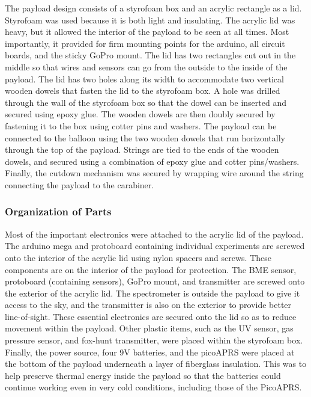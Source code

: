 \documentclass[12pt,]{article}
\begin{document}
The payload design consists of a styrofoam box and an acrylic rectangle
as a lid. Styrofoam was used because it is both light and insulating.
The acrylic lid was heavy, but it allowed the interior of the payload to
be seen at all times. Most importantly, it provided for firm mounting
points for the arduino, all circuit boards, and the sticky GoPro mount.
The lid has two rectangles cut out in the middle so that wires and
sensors can go from the outside to the inside of the payload. The lid
has two holes along its width to accommodate two vertical wooden dowels
that fasten the lid to the styrofoam box. A hole was drilled through the
wall of the styrofoam box so that the dowel can be inserted and secured
using epoxy glue. The wooden dowels are then doubly secured by fastening
it to the box using cotter pins and washers. The payload can be
connected to the balloon using the two wooden dowels that run
horizontally through the top of the payload. Strings are tied to the
ends of the wooden dowels, and secured using a combination of epoxy glue
and cotter pins/washers. Finally, the cutdown mechanism was secured by
wrapping wire around the string connecting the payload to the carabiner.

\subsubsection{Organization of Parts}\label{organization-of-parts}

Most of the important electronics were attached to the acrylic lid of
the payload. The arduino mega and protoboard containing individual
experiments are screwed onto the interior of the acrylic lid using nylon
spacers and screws. These components are on the interior of the payload
for protection. The BME sensor, protoboard (containing sensors), GoPro
mount, and transmitter are screwed onto the exterior of the acrylic lid.
The spectrometer is outside the payload to give it access to the sky,
and the transmitter is also on the exterior to provide better
line-of-sight. These essential electronics are secured onto the lid so
as to reduce movement within the payload. Other plastic items, such as
the UV sensor, gas pressure sensor, and fox-hunt transmitter, were
placed within the styrofoam box. Finally, the power source, four 9V
batteries, and the picoAPRS were placed at the bottom of the payload
underneath a layer of fiberglass insulation. This was to help preserve
thermal energy inside the payload so that the batteries could continue
working even in very cold conditions, including those of the PicoAPRS.
\end{document}
